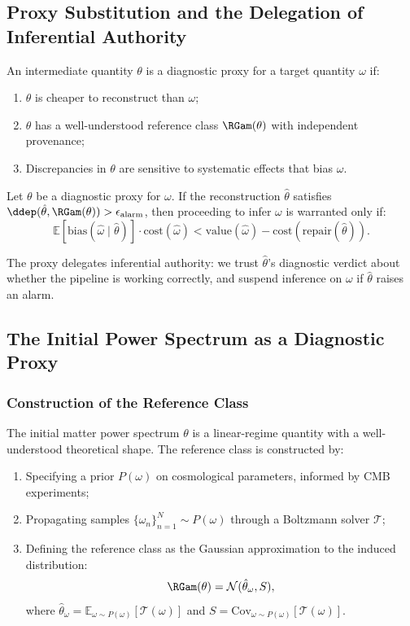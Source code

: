 \subsection{Proxy Substitution and the Delegation of Inferential Authority}

\begin{definition}
An intermediate quantity $\theta$ is a diagnostic proxy for a target quantity $\omega$ if:
\begin{enumerate}
\item $\theta$ is cheaper to reconstruct than $\omega$;
\item $\theta$ has a well-understood reference class $\RGam(\theta)$ with independent provenance;
\item Discrepancies in $\theta$ are sensitive to systematic effects that bias $\omega$.
\end{enumerate}
\end{definition}

\begin{proposition}
Let $\theta$ be a diagnostic proxy for $\omega$. If the reconstruction $\hat\theta$ satisfies $\ddep(\hat\theta, \RGam(\theta)) > \epsilon_{\mathrm{alarm}}$, then proceeding to infer $\omega$ is warranted only if:
\[
\mathbb{E}[\mathrm{bias}(\hat\omega \mid \hat\theta)] \cdot \mathrm{cost}(\hat\omega) < \mathrm{value}(\hat\omega) - \mathrm{cost}(\mathrm{repair}(\hat\theta)).
\]
\end{proposition}

The proxy delegates inferential authority: we trust $\hat\theta$'s diagnostic verdict about whether the pipeline is working correctly, and suspend inference on $\omega$ if $\hat\theta$ raises an alarm.


\subsection{The Initial Power Spectrum as a Diagnostic Proxy}

\subsubsection{Construction of the Reference Class}

The initial matter power spectrum $\theta$ is a linear-regime quantity with a well-understood theoretical shape. The reference class is constructed by:

\begin{enumerate}
\item Specifying a prior $P(\omega)$ on cosmological parameters, informed by CMB experiments;
\item Propagating samples $\{\omega_n\}_{n=1}^N \sim P(\omega)$ through a Boltzmann solver $\mathcal{T}$;
\item Defining the reference class as the Gaussian approximation to the induced distribution:
\[
\RGam(\theta) = \mathcal{N}(\hat\theta_\omega, S),
\]
where $\hat\theta_\omega = \mathbb{E}_{\omega \sim P(\omega)}[\mathcal{T}(\omega)]$ and $S = \mathrm{Cov}_{\omega \sim P(\omega)}[\mathcal{T}(\omega)]$.
\end{enumerate}

